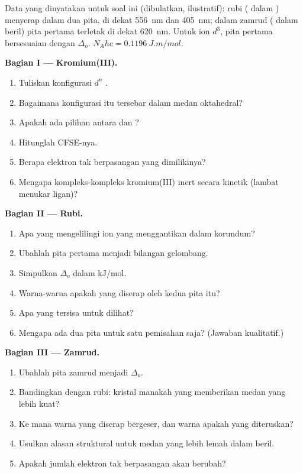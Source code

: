 \begin{problem}
\label{pb:b2:ligand-field:1}
Data yang dinyatakan untuk soal ini (dibulatkan, ilustratif): rubi (
dalam ) menyerap dalam dua pita, di dekat \qty{556}{nm} dan
\qty{405}{nm}; dalam zamrud ( dalam beril) pita pertama terletak di
dekat \qty{620}{nm}. Untuk ion $d^3$, pita pertama bersesuaian dengan
$\Delta_o$. $N_Ahc = \qty{0.1196}{J.m/mol}$.

\medskip
\noindent\textbf{Bagian I --- Kromium(III).}
\begin{enumerate}
  \item Tuliskan konfigurasi $d^n$ .
  \item Bagaimana konfigurasi itu tersebar dalam medan oktahedral?
  \item Apakah ada pilihan antara  dan ?
  \item Hitunglah CFSE-nya.
  \item Berapa elektron tak berpasangan yang dimilikinya?
  \item Mengapa kompleks-kompleks kromium(III) inert secara kinetik (lambat
        menukar ligan)?
\end{enumerate}

\medskip
\noindent\textbf{Bagian II --- Rubi.}
\begin{enumerate}[resume]
  \item Apa yang mengelilingi ion  yang menggantikan 
        dalam korundum?
  \item Ubahlah pita pertama menjadi bilangan gelombang.
  \item Simpulkan $\Delta_o$ dalam \unit{kJ/mol}.
  \item Warna-warna apakah yang diserap oleh kedua pita itu?
  \item Apa yang tersisa untuk dilihat?
  \item Mengapa ada dua pita untuk satu pemisahan saja? (Jawaban kualitatif.)
\end{enumerate}

\medskip
\noindent\textbf{Bagian III --- Zamrud.}
\begin{enumerate}[resume]
  \item Ubahlah pita zamrud menjadi $\Delta_o$.
  \item Bandingkan dengan rubi: kristal manakah yang memberikan medan yang lebih kuat?
  \item Ke mana warna yang diserap bergeser, dan warna apakah yang diteruskan?
  \item Usulkan alasan struktural untuk medan yang lebih lemah dalam beril.
  \item Apakah jumlah elektron tak berpasangan akan berubah?
\end{enumerate}


\end{problem}
